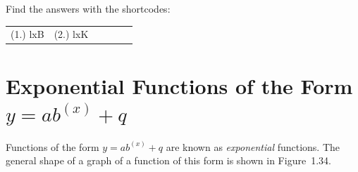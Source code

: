           

        
      

  \label{m39341**end}
          
\par {} Find the answers with the shortcodes:
 \par \begin{tabular}[h]{cccccc}
 (1.) lxB  &  (2.) lxK  & \end{tabular}


% 
%     
%     
%     
%     
%     
%     
  
      \label{m39348*uid172}
            \section{ Exponential Functions of the Form $y=a{b}^{\left(x\right)}+q$}
            \nopagebreak
        
        \label{m39348*id249604}Functions of the form \begin{math}y=a{b}^{\left(x\right)}+q\end{math} are known as \textsl{exponential} functions. The general shape of a graph of a function of this form is shown in Figure~1.34.\par 
        
    \setcounter{subfigure}{0}


